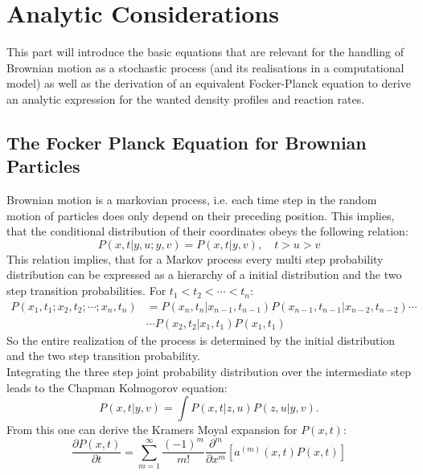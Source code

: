 \section{Analytic Considerations}

This part will introduce the basic equations that are relevant for the handling of Brownian motion as a stochastic process (and its realisations in a computational model) as well as the derivation of an equivalent Focker-Planck equation to derive an analytic expression for the wanted density profiles and reaction rates.

\subsection{The Focker Planck Equation for Brownian Particles}
Brownian motion is a markovian process, i.e. each time step in the random motion of particles does only depend on their preceding position. This implies, that the conditional distribution of their coordinates obeys the following relation:
\begin{equation}
    P(x,t|y,u;y,v) = P(x,t|y,v), \quad t>u>v
    \label{}
\end{equation}
This relation implies, that for a Markov process every multi step probability distribution can be expressed as a hierarchy of a initial distribution and the two step transition probabilities. For $ t_1 < t_2 < \cdots < t_n$:
\begin{align}
    P(x_1,t_1;x_2,t_2;\cdots;x_n,t_n) &= P(x_n,t_n|x_{n-1},t_{n-1})P(x_{n-1},t_{n-1}|x_{n-2},t_{n-2}) \cdots \nonumber \\
                                      & \cdots P(x_2,t_2|x_1,t_1)P(x_1,t_1)
    \label{hierarchy}
\end{align}
So the entire realization of the process is determined by the initial distribution and the two step transition probability. \\
Integrating the three step joint probability distribution over the intermediate step leads to the Chapman Kolmogorov equation:
\begin{equation}
    P(x,t|y,v) = \int P(x,t|z,u) P(z,u|y,v).
    \label{Chapman Kolmogorov equation}
\end{equation}
From this one can derive the Kramers Moyal expansion for $P(x,t)$:
\begin{equation}
\frac{\partial P(x,t)}{\partial t} = \sum_{m = 1}^{\infty}\frac{(-1)^{m}}{m!}\frac{\partial^m}{\partial x^m} \left[ a^{(m)}(x,t) P(x,t) \right]
    \label{Kramers Moyal expansion}
\end{equation}
